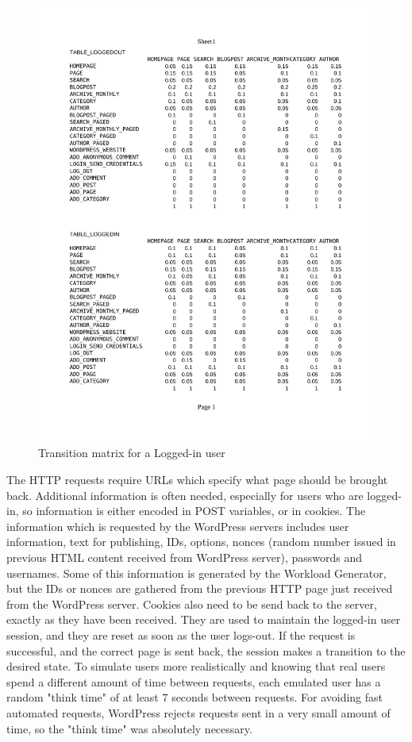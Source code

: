   \begin{figure}[t]
    \centering %
    \includegraphics[trim=2cm 14cm 2cm 3.2cm, clip=true, scale=0.85]{src/img/transitionTable.pdf}
    \caption{Transition matrix for a Logged-in user}
    \label{figure:transition-table}
  \end{figure}

The HTTP requests require URLs which specify what page should be brought back. Additional information is often needed, especially for users who are logged-in, so information is either encoded in POST variables, or in cookies. The information which is requested by the WordPress servers includes user information, text for publishing, IDs, options, nonces (random number issued in previous HTML content received from WordPress server), passwords and usernames. Some of this information is generated by the Workload Generator, but the IDs or nonces are gathered from the previous HTTP page just received from the WordPress server. Cookies also need to be send back to the server, exactly as they have been received. They are used to maintain the logged-in user session, and they are reset as soon as the user logs-out. If the request is successful, and the correct page is sent back, the session makes a transition to the desired state. To simulate users more realistically and knowing that real users spend a different amount of time between requests, each emulated user has a random "think time" of at least 7 seconds between requests. For avoiding fast automated requests, WordPress rejects requests sent in a very small amount of time, so the "think time" was absolutely necessary.

